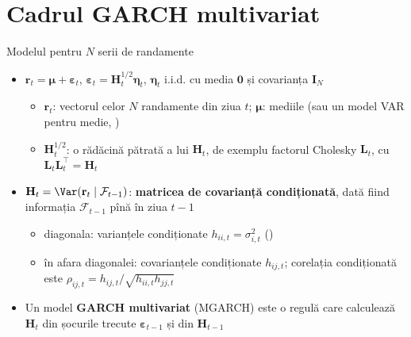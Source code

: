 \section{Cadrul GARCH multivariat}

\begin{frame}{Modelul pentru $N$ serii de randamente}
\itemsize{\small}
\begin{itemize}
    \item $\mathbf{r}_t = \boldsymbol{\mu} + \boldsymbol{\varepsilon}_t$, \quad $\boldsymbol{\varepsilon}_t = \mathbf{H}_t^{1/2}\boldsymbol{\eta}_t$, \quad $\boldsymbol{\eta}_t$ i.i.d. cu media $\mathbf{0}$ și covarianța $\mathbf{I}_N$
    \begin{itemize}
        \item $\mathbf{r}_t$: vectorul celor $N$ randamente din ziua $t$; $\boldsymbol{\mu}$: mediile (sau un model VAR pentru medie, )
        \item $\mathbf{H}_t^{1/2}$: o rădăcină pătrată a lui $\mathbf{H}_t$, de exemplu factorul Cholesky $\mathbf{L}_t$, cu $\mathbf{L}_t\mathbf{L}_t^\top = \mathbf{H}_t$
    \end{itemize}
    \item $\mathbf{H}_t = \Var(\mathbf{r}_t \mid \mathcal{F}_{t-1})$: \textbf{matricea de covarianță condiționată}, dată fiind informația $\mathcal{F}_{t-1}$ pînă în ziua $t-1$
    \begin{itemize}
        \item diagonala: varianțele condiționate $h_{ii,t} = \sigma_{i,t}^2$ ()
        \item în afara diagonalei: covarianțele condiționate $h_{ij,t}$; corelația condiționată este $\rho_{ij,t} = h_{ij,t}/\sqrt{h_{ii,t}h_{jj,t}}$
    \end{itemize}
    \item Un model \textbf{GARCH multivariat} (MGARCH) este o regulă care calculează $\mathbf{H}_t$ din șocurile trecute $\boldsymbol{\varepsilon}_{t-1}$ și din $\mathbf{H}_{t-1}$
\end{itemize}
\end{frame}


